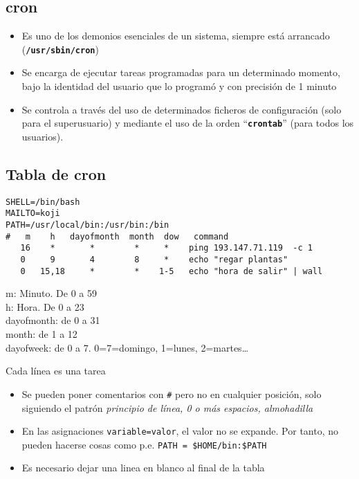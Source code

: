\documentclass[ucs]{beamer}
\begin{document}
\begin{frame}[fragile]
  \subsection{cron}

  \begin{itemize}
  \item Es uno de los demonios esenciales de un sistema, siempre está
    arrancado (\texttt{\textbf{/usr/sbin/cron}})
  \item Se encarga de ejecutar tareas programadas para un determinado
    momento, bajo la identidad del usuario que lo programó y con
    precisión de 1 minuto
  \item Se controla a través del uso de determinados ficheros de
    configuración (solo para el superusuario) y mediante el uso de la
    orden ``\texttt{\textbf{crontab}}'' (para todos los usuarios).
  \end{itemize}
\end{frame}
\begin{frame}[fragile]
\subsection{Tabla de cron}


\begin{scriptsize}
\begin{verbatim}
SHELL=/bin/bash
MAILTO=koji
PATH=/usr/local/bin:/usr/bin:/bin
#   m    h   dayofmonth  month  dow   command
   16    *       *        *     *    ping 193.147.71.119  -c 1
   0     9       4        8     *    echo "regar plantas"
   0   15,18     *        *    1-5   echo "hora de salir" | wall
\end{verbatim}
\end{scriptsize}

m: Minuto. De 0 a 59\\
h: Hora. De 0 a 23\\
dayofmonth: de 0 a 31\\
month: de 1 a 12\\
dayofweek: de 0 a 7. 0=7=domingo, 1=lunes, 2=martes\ldots

Cada línea es una tarea
\end{frame}
\begin{frame}[fragile]

\begin{itemize}
\item
Se pueden poner comentarios con
\verb|#| pero no en cualquier posición, solo siguiendo
el patrón \emph{principio de línea, 0 o más espacios, almohadilla}
\item
En las asignaciones \verb|variable=valor|, el valor no se expande.
Por tanto, no pueden hacerse cosas como p.e. \verb|PATH = $HOME/bin:$PATH|
\item
Es necesario dejar una linea en blanco al final de la tabla
\end{itemize}
\end{frame}
\end{document}
